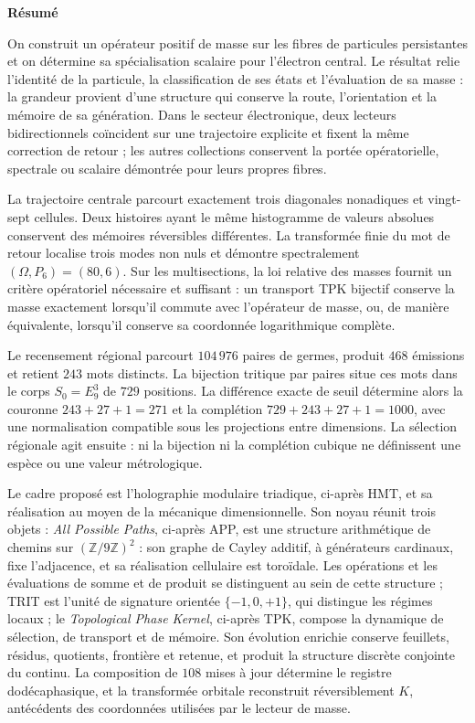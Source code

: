 \begin{center}\bfseries Résumé\end{center}
\begingroup
\fontsize{9.3}{10.4}\selectfont
\setlength{\parskip}{1.5pt plus .5pt minus .5pt}
\noindent
On construit un opérateur positif de masse sur les fibres de particules
persistantes et on détermine sa spécialisation scalaire pour l’électron
central. Le résultat relie l’identité de la particule, la classification
de ses états et l’évaluation de sa masse : la grandeur provient d’une
structure qui conserve la route, l’orientation et la mémoire de sa
génération. Dans le secteur électronique, deux lecteurs bidirectionnels
coïncident sur une trajectoire explicite et fixent la même correction de
retour ; les autres collections conservent la portée opératorielle, spectrale ou
scalaire démontrée pour leurs propres fibres.


La trajectoire centrale parcourt exactement trois diagonales nonadiques et
vingt-sept cellules. Deux histoires ayant le même histogramme de valeurs absolues
conservent des mémoires réversibles différentes. La transformée finie du mot
de retour localise trois modes non nuls et démontre spectralement
$(\Omega,P_6)=(80,6)$. Sur les multisections, la loi relative des masses
fournit un critère opératoriel nécessaire et suffisant : un transport TPK
bijectif conserve la masse exactement lorsqu’il commute avec l’opérateur de masse,
ou, de manière équivalente, lorsqu’il conserve sa coordonnée logarithmique complète.


Le recensement régional parcourt \(104\,976\) paires de germes, produit \(468\)
émissions et retient \(243\) mots distincts. La bijection tritique par paires
situe ces mots dans le corps \(S_0=E_9^3\) de \(729\) positions. La
différence exacte de seuil détermine alors la couronne
\(243+27+1=271\) et la complétion
\(729+243+27+1=1000\), avec une normalisation compatible sous les projections
entre dimensions. La sélection régionale agit ensuite : ni la bijection ni
la complétion cubique ne définissent une espèce ou une valeur métrologique.


Le cadre proposé est l’holographie modulaire triadique, ci-après HMT, et
sa réalisation au moyen de la mécanique dimensionnelle. Son noyau réunit trois objets :
\emph{All Possible Paths}, ci-après APP, est une structure arithmétique
de chemins sur \((\mathbb Z/9\mathbb Z)^2\) : son graphe de Cayley additif,
à générateurs cardinaux, fixe l’adjacence, et sa réalisation cellulaire
est toroïdale. Les opérations et les évaluations de somme et de produit se
distinguent au sein de cette structure ;
TRIT est l’unité de signature orientée \(\{-1,0,+1\}\), qui distingue les
régimes locaux ; le \emph{Topological Phase Kernel}, ci-après TPK,
compose la dynamique de sélection, de transport et de mémoire. Son évolution
enrichie conserve feuillets, résidus, quotients, frontière et retenue, et
produit la structure discrète conjointe du continu. La composition de
\(108\) mises à jour détermine le registre dodécaphasique, et la transformée
orbitale reconstruit réversiblement \(K\), antécédents des coordonnées utilisées par le lecteur
de masse.



